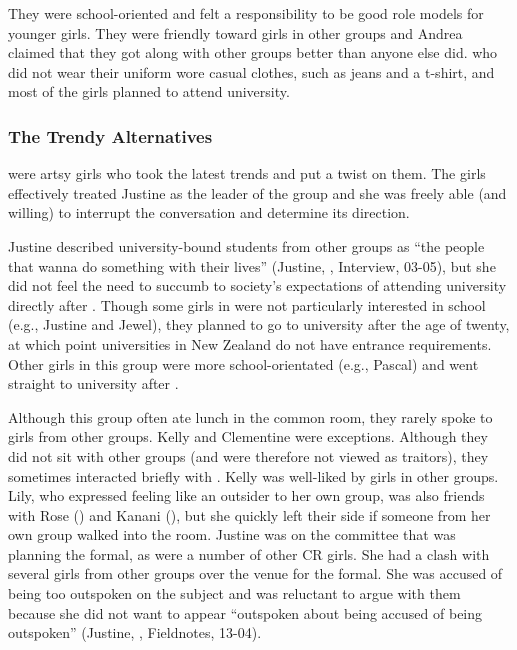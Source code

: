 \vspace{5 mm}

They were school-oriented and felt a responsibility to be good role models for younger girls. They were friendly toward girls in other groups and Andrea claimed that they got along with other groups better than anyone else did.  who did not wear their uniform wore casual clothes, such as jeans and a t-shirt, and most of the girls planned to attend university. 


\subsubsection{The Trendy Alternatives}
 were artsy girls who took the latest trends and put a twist on them. The girls effectively treated Justine as the leader of the group and she was freely able (and willing) to interrupt the conversation and determine its direction.

Justine described university-bound students from other groups as ``the people that wanna do something with their lives'' (Justine, , Interview, 03-05), but she did not feel the need to succumb to society's expectations of attending university directly after . Though some girls in  were not particularly interested in school (e.g., Justine and Jewel), they planned to go to university after the age of twenty, at which point universities in New Zealand do not have entrance requirements. Other girls in this group were more school-orientated (e.g., Pascal) and went straight to university after . 

\largerpage[-1] %
Although this group often ate lunch in the common room, they rarely spoke to girls from other groups. Kelly and Clementine were exceptions. Although they did not sit with other groups (and were therefore not viewed as traitors), they sometimes interacted briefly with . Kelly was well-liked by girls in other groups. Lily, who expressed feeling like an outsider to her own group, was also friends with Rose () and Kanani (), but she quickly left their side if someone from her own group walked into the room. Justine was on the committee that was planning the formal, as were a number of other CR girls. She had a clash with several girls from other groups over the venue for the formal. She was accused of being too outspoken on the subject and was reluctant to argue with them because she did not want to appear ``outspoken about being accused of being outspoken'' (Justine, , Fieldnotes, 13-04).

